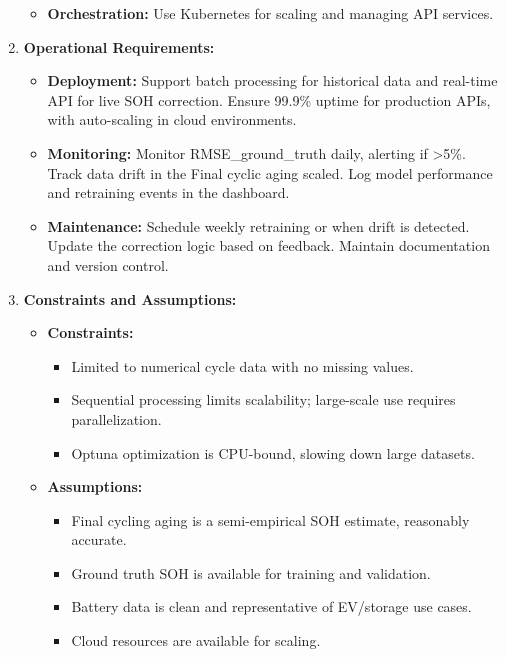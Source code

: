\begin{enumerate}
\begin{itemize}
        \item \textbf{Orchestration:} Use Kubernetes for scaling and managing API services.
    \end{itemize}
    \item \textbf{Operational Requirements:}\begin{itemize}
        \item \textbf{Deployment:} Support batch processing for historical data and real-time API for live SOH correction. Ensure 99.9\% uptime for production APIs, with auto-scaling in cloud environments.
        \item \textbf{Monitoring:} Monitor RMSE\_ground\_truth daily, alerting if >5\%. Track data drift in the Final cyclic aging scaled. Log model performance and retraining events in the dashboard.
        \item \textbf{Maintenance:} Schedule weekly retraining or when drift is detected. Update the correction logic based on feedback. Maintain documentation and version control.
    \end{itemize}
    \item \textbf{Constraints and Assumptions:} \begin{itemize}
        \item \textbf{Constraints:} \begin{itemize}
            \item Limited to numerical cycle data with no missing values.
            \item Sequential processing limits scalability; large-scale use requires parallelization.
            \item Optuna optimization is CPU-bound, slowing down large datasets.
        \end{itemize}
        \item \textbf{Assumptions:} \begin{itemize}
            \item Final cycling aging is a semi-empirical SOH estimate, reasonably accurate.
            \item Ground truth SOH is available for training and validation.
            \item Battery data is clean and representative of EV/storage use cases.
            \item Cloud resources are available for scaling.
        \end{itemize}
    \end{itemize}
\end{enumerate}

